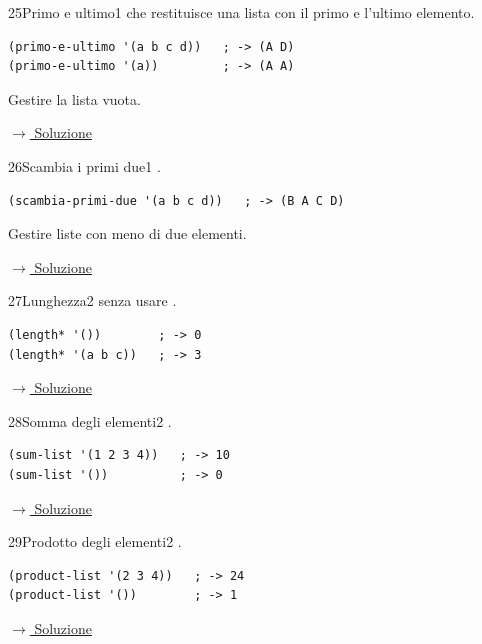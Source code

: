 \label{ex:25}
\begin{colbox}{25}{Primo e ultimo}{1}
  che restituisce una lista
con il primo e l'ultimo elemento.
\begin{lstlisting}
(primo-e-ultimo '(a b c d))   ; -> (A D)
(primo-e-ultimo '(a))         ; -> (A A)
\end{lstlisting}
Gestire la lista vuota.


\small\color{black!55}\hyperref[sol:25]{$\rightarrow$ Soluzione}\normalsize\color{black}
\end{colbox}

\label{ex:26}
\begin{colbox}{26}{Scambia i primi due}{1}
 .
\nopagebreak
\begin{lstlisting}
(scambia-primi-due '(a b c d))   ; -> (B A C D)
\end{lstlisting}
Gestire liste con meno di due elementi.


\small\color{black!55}\hyperref[sol:26]{$\rightarrow$ Soluzione}\normalsize\color{black}
\end{colbox}

\label{ex:27}
\begin{essbox}{27}{Lunghezza}{2}
  senza usare .
\nopagebreak
\begin{lstlisting}
(length* '())        ; -> 0
(length* '(a b c))   ; -> 3
\end{lstlisting}


\small\color{black!55}\hyperref[sol:27]{$\rightarrow$ Soluzione}\normalsize\color{black}
\end{essbox}

\label{ex:28}
\begin{stdbox}{28}{Somma degli elementi}{2}
 .
\nopagebreak
\begin{lstlisting}
(sum-list '(1 2 3 4))   ; -> 10
(sum-list '())          ; -> 0
\end{lstlisting}


\small\color{black!55}\hyperref[sol:28]{$\rightarrow$ Soluzione}\normalsize\color{black}
\end{stdbox}

\label{ex:29}
\begin{colbox}{29}{Prodotto degli elementi}{2}
 .
\nopagebreak
\begin{lstlisting}
(product-list '(2 3 4))   ; -> 24
(product-list '())        ; -> 1
\end{lstlisting}


\small\color{black!55}\hyperref[sol:29]{$\rightarrow$ Soluzione}\normalsize\color{black}
\end{colbox}

